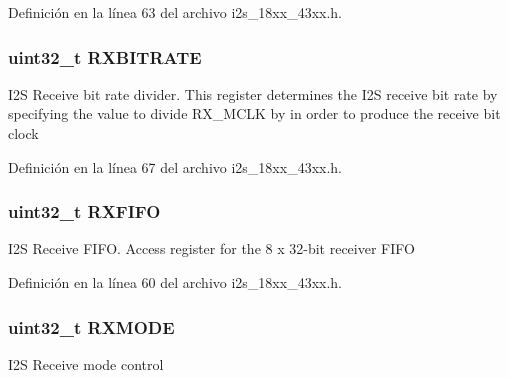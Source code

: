 Definición en la línea 63 del archivo i2s\+\_\+18xx\+\_\+43xx.\+h.

\subsubsection[{\texorpdfstring{R\+X\+B\+I\+T\+R\+A\+TE}{RXBITRATE}}]{ uint32\+\_\+t R\+X\+B\+I\+T\+R\+A\+TE}\hypertarget{struct_l_p_c___i2_s___t_a2c446eeb84edc6509a4dc907fb651e10}{}\label{struct_l_p_c___i2_s___t_a2c446eeb84edc6509a4dc907fb651e10}
I2S Receive bit rate divider. This register determines the I2S receive bit rate by specifying the value to divide R\+X\+\_\+\+M\+C\+LK by in order to produce the receive bit clock 

Definición en la línea 67 del archivo i2s\+\_\+18xx\+\_\+43xx.\+h.

\subsubsection[{\texorpdfstring{R\+X\+F\+I\+FO}{RXFIFO}}]{ uint32\+\_\+t R\+X\+F\+I\+FO}\hypertarget{struct_l_p_c___i2_s___t_ab8607f5638e22b5060695ea306835e56}{}\label{struct_l_p_c___i2_s___t_ab8607f5638e22b5060695ea306835e56}
I2S Receive F\+I\+FO. Access register for the 8 x 32-\/bit receiver F\+I\+FO 

Definición en la línea 60 del archivo i2s\+\_\+18xx\+\_\+43xx.\+h.

\subsubsection[{\texorpdfstring{R\+X\+M\+O\+DE}{RXMODE}}]{ uint32\+\_\+t R\+X\+M\+O\+DE}\hypertarget{struct_l_p_c___i2_s___t_a9ce107cf8f0a1415501724ee6d607af8}{}\label{struct_l_p_c___i2_s___t_a9ce107cf8f0a1415501724ee6d607af8}
I2S Receive mode control 

